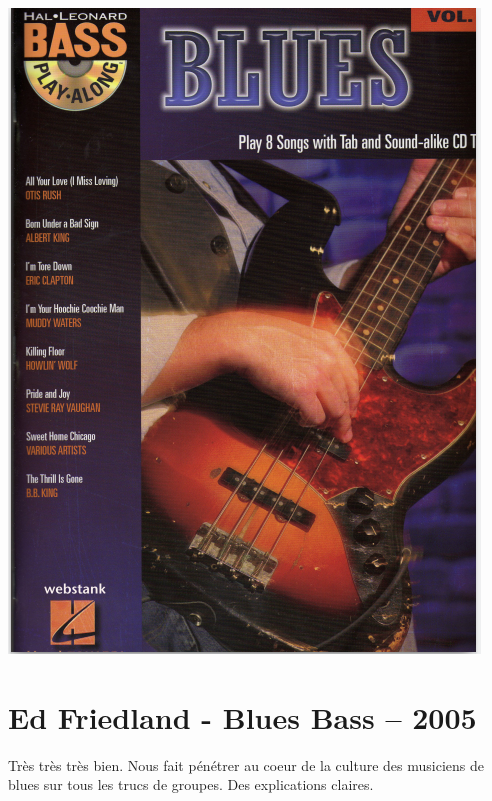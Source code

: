 \documentclass[a4paper]{book}
\begin{document}
\begin{center}
\includegraphics[width=12.513cm,hesight=17.089cm]{lebluessupportsmethodes-img150.png}
\end{center}


\clearpage\section{Ed Friedland - Blues Bass -- 2005}
Très très très bien. Nous fait pénétrer au coeur de la culture des musiciens de blues sur tous les trucs de groupes. Des explications claires.
\end{document}
